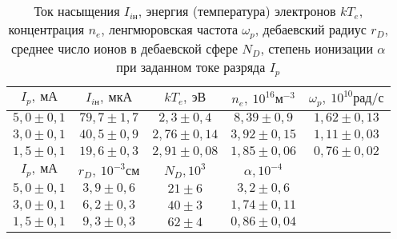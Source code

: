 \renewcommand{\arraystretch}{1.2} 

\begin{table}[H]
    \begin{tabular}{|c|c|c|c|c|}
        \hline
        $I_p, \ \text{мА}$ &
        $I_{i\text{н}}, \ \text{мкА}$ &
        $kT_e, \ \text{эВ}$ & $n_e,
        \ 10^{16} \text{м}^{-3}$ &
        $\omega_p, \ 10^{10}\text{рад/с}$ \\ \hline
        $5,0 \pm 0,1$ & $79,7 \pm 1,7$ & $2,3 \pm
        0,4$ &
        $8,39 \pm 0,9$ & $1,62 \pm 0,13$ \\ \hline
        $3,0 \pm 0,1$ & $40,5 \pm 0,9$ & $2,76 \pm
        0,14$
                      & $3,92 \pm 0,15$
                      & $1,11 \pm 0,03$ \\ \hline
        $1,5 \pm 0,1$ & $19,6 \pm 0,3$ & $2,91 \pm
        0,08$ & $1,85 \pm 0,06$ & $0,76
        \pm 0,02$\\ \hline \hline
        
        $I_p, \ \text{мА}$ &
        $r_D, \ 10^{-3}\text{см}$ &
        $N_D, 10^3$ & $\alpha,
        10^{-4}$\\ \cline{1-4}
        $5,0 \pm 0,1$  & $3,9 \pm
        0,6$ &
        $21 \pm 6$ & $3,2\pm 0,6$ \\
        \cline{1-4}
        $3,0 \pm 0,1$  & $6,2 \pm
        0,3$
          & $40 \pm 3$ & $1,74 \pm
          0,11$\\ \cline{1-4}
        $1,5 \pm 0,1$  & $9,3 \pm
        0,3$ & $62 \pm 4$ & $0,86 \pm
        0,04$ \\ \cline{1-4}
    \end{tabular}
    \captionsetup{justification=centering}
    \caption{Ток насыщения
    $I_{i\text{н}}$, энергия
(температура) электронов $kT_e$, 
концентрация $n_e$, ленгмюровская частота
    $\omega_p$, дебаевский радиус
$r_D$, среднее число ионов в дебаевской
сфере $N_D$, степень ионизации $\alpha$
при заданном токе разряда  $I_p$
}
\end{table}


